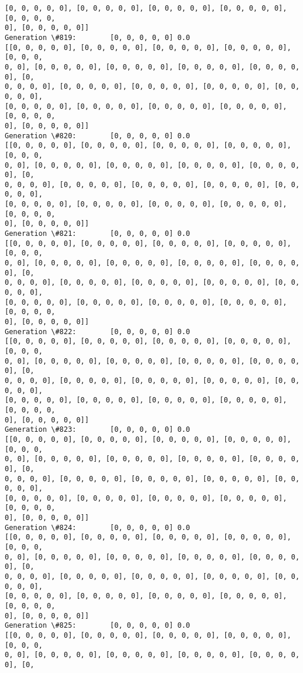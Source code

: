 \documentclass[11pt]{article}
\begin{document}
\begin{Verbatim}[commandchars=\\\{\}]
[0, 0, 0, 0, 0], [0, 0, 0, 0, 0], [0, 0, 0, 0, 0], [0, 0, 0, 0, 0], [0, 0, 0, 0,
0], [0, 0, 0, 0, 0]]
Generation \#819:        [0, 0, 0, 0, 0] 0.0
[[0, 0, 0, 0, 0], [0, 0, 0, 0, 0], [0, 0, 0, 0, 0], [0, 0, 0, 0, 0], [0, 0, 0,
0, 0], [0, 0, 0, 0, 0], [0, 0, 0, 0, 0], [0, 0, 0, 0, 0], [0, 0, 0, 0, 0], [0,
0, 0, 0, 0], [0, 0, 0, 0, 0], [0, 0, 0, 0, 0], [0, 0, 0, 0, 0], [0, 0, 0, 0, 0],
[0, 0, 0, 0, 0], [0, 0, 0, 0, 0], [0, 0, 0, 0, 0], [0, 0, 0, 0, 0], [0, 0, 0, 0,
0], [0, 0, 0, 0, 0]]
Generation \#820:        [0, 0, 0, 0, 0] 0.0
[[0, 0, 0, 0, 0], [0, 0, 0, 0, 0], [0, 0, 0, 0, 0], [0, 0, 0, 0, 0], [0, 0, 0,
0, 0], [0, 0, 0, 0, 0], [0, 0, 0, 0, 0], [0, 0, 0, 0, 0], [0, 0, 0, 0, 0], [0,
0, 0, 0, 0], [0, 0, 0, 0, 0], [0, 0, 0, 0, 0], [0, 0, 0, 0, 0], [0, 0, 0, 0, 0],
[0, 0, 0, 0, 0], [0, 0, 0, 0, 0], [0, 0, 0, 0, 0], [0, 0, 0, 0, 0], [0, 0, 0, 0,
0], [0, 0, 0, 0, 0]]
Generation \#821:        [0, 0, 0, 0, 0] 0.0
[[0, 0, 0, 0, 0], [0, 0, 0, 0, 0], [0, 0, 0, 0, 0], [0, 0, 0, 0, 0], [0, 0, 0,
0, 0], [0, 0, 0, 0, 0], [0, 0, 0, 0, 0], [0, 0, 0, 0, 0], [0, 0, 0, 0, 0], [0,
0, 0, 0, 0], [0, 0, 0, 0, 0], [0, 0, 0, 0, 0], [0, 0, 0, 0, 0], [0, 0, 0, 0, 0],
[0, 0, 0, 0, 0], [0, 0, 0, 0, 0], [0, 0, 0, 0, 0], [0, 0, 0, 0, 0], [0, 0, 0, 0,
0], [0, 0, 0, 0, 0]]
Generation \#822:        [0, 0, 0, 0, 0] 0.0
[[0, 0, 0, 0, 0], [0, 0, 0, 0, 0], [0, 0, 0, 0, 0], [0, 0, 0, 0, 0], [0, 0, 0,
0, 0], [0, 0, 0, 0, 0], [0, 0, 0, 0, 0], [0, 0, 0, 0, 0], [0, 0, 0, 0, 0], [0,
0, 0, 0, 0], [0, 0, 0, 0, 0], [0, 0, 0, 0, 0], [0, 0, 0, 0, 0], [0, 0, 0, 0, 0],
[0, 0, 0, 0, 0], [0, 0, 0, 0, 0], [0, 0, 0, 0, 0], [0, 0, 0, 0, 0], [0, 0, 0, 0,
0], [0, 0, 0, 0, 0]]
Generation \#823:        [0, 0, 0, 0, 0] 0.0
[[0, 0, 0, 0, 0], [0, 0, 0, 0, 0], [0, 0, 0, 0, 0], [0, 0, 0, 0, 0], [0, 0, 0,
0, 0], [0, 0, 0, 0, 0], [0, 0, 0, 0, 0], [0, 0, 0, 0, 0], [0, 0, 0, 0, 0], [0,
0, 0, 0, 0], [0, 0, 0, 0, 0], [0, 0, 0, 0, 0], [0, 0, 0, 0, 0], [0, 0, 0, 0, 0],
[0, 0, 0, 0, 0], [0, 0, 0, 0, 0], [0, 0, 0, 0, 0], [0, 0, 0, 0, 0], [0, 0, 0, 0,
0], [0, 0, 0, 0, 0]]
Generation \#824:        [0, 0, 0, 0, 0] 0.0
[[0, 0, 0, 0, 0], [0, 0, 0, 0, 0], [0, 0, 0, 0, 0], [0, 0, 0, 0, 0], [0, 0, 0,
0, 0], [0, 0, 0, 0, 0], [0, 0, 0, 0, 0], [0, 0, 0, 0, 0], [0, 0, 0, 0, 0], [0,
0, 0, 0, 0], [0, 0, 0, 0, 0], [0, 0, 0, 0, 0], [0, 0, 0, 0, 0], [0, 0, 0, 0, 0],
[0, 0, 0, 0, 0], [0, 0, 0, 0, 0], [0, 0, 0, 0, 0], [0, 0, 0, 0, 0], [0, 0, 0, 0,
0], [0, 0, 0, 0, 0]]
Generation \#825:        [0, 0, 0, 0, 0] 0.0
[[0, 0, 0, 0, 0], [0, 0, 0, 0, 0], [0, 0, 0, 0, 0], [0, 0, 0, 0, 0], [0, 0, 0,
0, 0], [0, 0, 0, 0, 0], [0, 0, 0, 0, 0], [0, 0, 0, 0, 0], [0, 0, 0, 0, 0], [0,

\end{Verbatim}
\end{document}
